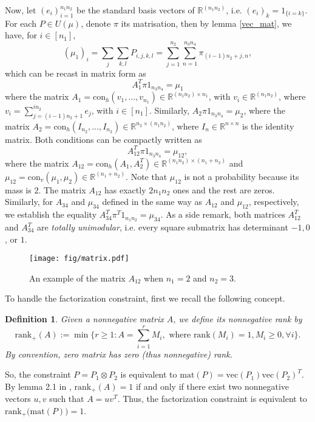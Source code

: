 \documentclass{article}
\newtheorem{definition}{Definition}[section]
\begin{document}
Now, let $(e_i)_{i=1}^{n_1 n_2}$ be the standard basis vectors of $\mathbb R^{(n_1 n_2)}$, i.e. $(e_i)_k = 1_{\{i=k\}}$. 
For each $P \in U(\mu)$, denote $\pi$ its matrisation, then by lemma \ref{vec_mat}, we have, for $i \in [n_1]$,
\begin{equation*}
  (\mu_1)_i = \sum_j \sum_{k,l} P_{i,j,k,l} = \sum_{j = 1}^{n_2} \sum_{n=1}^{n_3 n_4} \pi_{(i-1) n_2 + j, n},
\end{equation*}
which can be recast in matrix form as
\begin{equation*}
  A_1^T \pi 1_{n_3 n_4} = \mu_1
\end{equation*}
where the matrix $A_1 = \text{con}_{h}(v_1, ..., v_{n_1}) \in \mathbb R^{(n_1 n_2) \times n_1}$, with 
$v_i \in \mathbb R^{(n_1 n_2)}$, where $v_i = \sum_{j=(i-1)n_2 + 1}^{i n_2} e_j$, with $i \in [n_1]$. Similarly, 
$A_2 \pi 1_{n_3 n_4} = \mu_2$, where the matrix 
$A_2 = \text{con}_h(I_{n_2}, ..., I_{n_2}) \in \mathbb R^{n_2 \times (n_1 n_2)}$, where $I_n \in \mathbb R^{n \times n}$ 
is the identity matrix. Both conditions can be compactly written as
\begin{equation*}
  A_{12}^T \pi 1_{n_3 n_4} = \mu_{12},
\end{equation*}
where the matrix $A_{12} = \text{con}_h(A_1, A_2^T) \in \mathbb R^{(n_1 n_2) \times (n_1+n_2)}$ and 
$\mu_{12} = \text{con}_v(\mu_1, \mu_2) \in \mathbb R^{(n_1 + n_2)}$. Note that $\mu_{12}$ is not a probability 
because its mass is $2$. The matrix $A_{12}$ has exactly $2n_1n_2$ ones and the rest are zeros. Similarly, 
for $A_{34}$ and $\mu_{34}$ defined in the same way as $A_{12}$ and 
$\mu_{12}$, respectively, we establish the equality $A_{34}^T \pi^T 1_{n_1 n_2} = \mu_{34}$. 
As a side remark, both matrices $A_{12}^T$ and $A_{34}^T$ are \textit{totally unimodular}, i.e. every square submatrix has determinant 
$-1, 0$, or $1$.
\begin{figure}[ht]
  \centering
  \texttt{[image: fig/matrix.pdf]}
  \caption{An example of the matrix $A_{12}$ when $n_1=2$ and $n_2=3$.}
  \label{fig:matrix}
\end{figure}

To handle the factorization constraint, first we recall the following concept.
\begin{definition}
  Given a nonnegative matrix $A$, we define its nonnegative rank by
  \begin{equation*}
    \text{rank}_{+}(A):= \min \big\{ r \geq 1: A = \sum_{i=1}^r M_i, \text{ where } \text{rank}(M_i) = 1, M_i \geq 0, \forall i \big\}.
  \end{equation*}
  By convention, zero matrix has zero (thus nonnegative) rank.
\end{definition}
So, the constraint $P = P_1 \otimes P_2$ is equivalent to $\text{mat}(P) = \text{vec}(P_1) \text{vec}(P_2)^T$. 
By lemma 2.1 in \citep{Joel93}, $\text{rank}_+(A) = 1$ if and only if there exist two nonnegative vectors $u,v$ such that 
$A = u v^T$. Thus, the factorization constraint is equivalent to $\text{rank}_+\big( \text{mat}(P) \big) = 1$.
\end{document}
